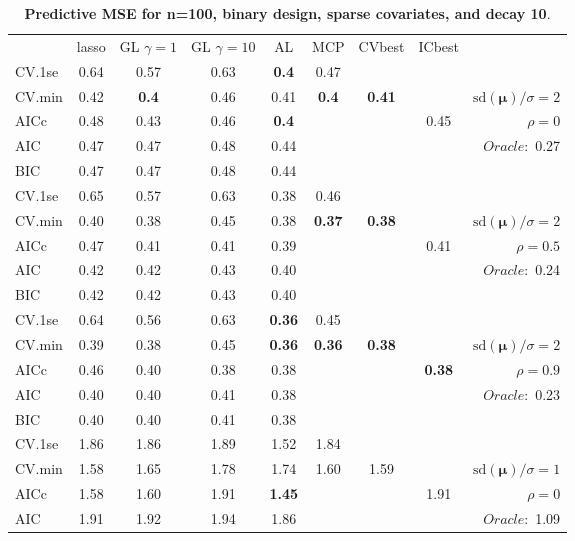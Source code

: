 \begin{table}\vspace{-.5cm}
\caption[l]{ { \bf Predictive MSE for n=100, binary design, 
sparse covariates, and  decay  10}.}
\vspace{-.5cm}
\footnotesize{}
\begin{center}
\begin{tabular}{l*{7}{c}|r}
 & lasso & GL $\gamma=1$ & GL $\gamma=10$ & AL & MCP  & CVbest & ICbest  \\
\cline{1-9}
CV.1se & 0.64 & 0.57 & 0.63 & {\bf 0.4} & 0.47 & & & \\
CV.min & 0.42 & {\bf 0.4} & 0.46 & 0.41 & {\bf 0.4} & {\bf 0.41} & & $\mathrm{sd}(\mathbf{\mu})/\sigma=2$ \\
AICc & 0.48 & 0.43 & 0.46 & {\bf 0.4} & & & 0.45 &  $\rho=0$ \\
AIC & 0.47 & 0.47 & 0.48 & 0.44 & & & &  \multirow{2}{*}{$Oracle: $ 0.27} \\
BIC & 0.47 & 0.47 & 0.48 & 0.44 & & & &  \\
 \hline 
CV.1se & 0.65 & 0.57 & 0.63 & 0.38 & 0.46 & & & \\
CV.min & 0.40 & 0.38 & 0.45 & 0.38 & {\bf 0.37} & {\bf 0.38} & & $\mathrm{sd}(\mathbf{\mu})/\sigma=2$ \\
AICc & 0.47 & 0.41 & 0.41 & 0.39 & & & 0.41 &  $\rho=0.5$ \\
AIC & 0.42 & 0.42 & 0.43 & 0.40 & & & &  \multirow{2}{*}{$Oracle: $ 0.24} \\
BIC & 0.42 & 0.42 & 0.43 & 0.40 & & & &  \\
 \hline 
CV.1se & 0.64 & 0.56 & 0.63 & {\bf 0.36} & 0.45 & & & \\
CV.min & 0.39 & 0.38 & 0.45 & {\bf 0.36} & {\bf 0.36} & {\bf 0.38} & & $\mathrm{sd}(\mathbf{\mu})/\sigma=2$ \\
AICc & 0.46 & 0.40 & 0.38 & 0.38 & & & {\bf 0.38} &  $\rho=0.9$ \\
AIC & 0.40 & 0.40 & 0.41 & 0.38 & & & &  \multirow{2}{*}{$Oracle: $ 0.23} \\
BIC & 0.40 & 0.40 & 0.41 & 0.38 & & & &  \\
 \hline 
CV.1se & 1.86 & 1.86 & 1.89 & 1.52 & 1.84 & & & \\
CV.min & 1.58 & 1.65 & 1.78 & 1.74 & 1.60 & 1.59 & & $\mathrm{sd}(\mathbf{\mu})/\sigma=1$ \\
AICc & 1.58 & 1.60 & 1.91 & {\bf 1.45} & & & 1.91 &  $\rho=0$ \\
AIC & 1.91 & 1.92 & 1.94 & 1.86 & & & &  \multirow{2}{*}{$Oracle: $ 1.09} \\

\end{tabular}
\end{center}
\end{table}

